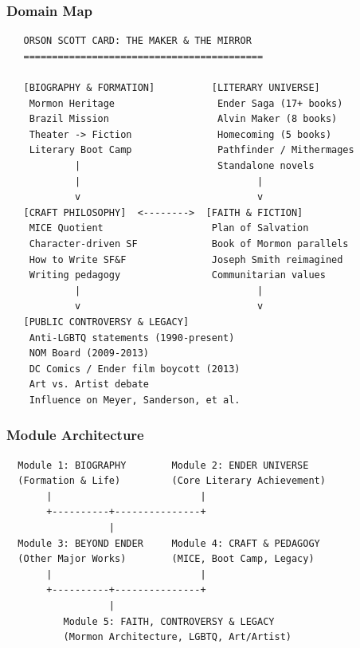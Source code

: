 \documentclass[11pt,letterpaper]{article}
\begin{document}
\subsubsection{Domain Map}

\begin{asciibox}
\begin{verbatim}
   ORSON SCOTT CARD: THE MAKER & THE MIRROR
   ==========================================

   [BIOGRAPHY & FORMATION]          [LITERARY UNIVERSE]
    Mormon Heritage                  Ender Saga (17+ books)
    Brazil Mission                   Alvin Maker (8 books)
    Theater -> Fiction               Homecoming (5 books)
    Literary Boot Camp               Pathfinder / Mithermages
            |                        Standalone novels
            |                               |
            v                               v
   [CRAFT PHILOSOPHY]  <-------->  [FAITH & FICTION]
    MICE Quotient                   Plan of Salvation
    Character-driven SF             Book of Mormon parallels
    How to Write SF&F               Joseph Smith reimagined
    Writing pedagogy                Communitarian values
            |                               |
            v                               v
   [PUBLIC CONTROVERSY & LEGACY]
    Anti-LGBTQ statements (1990-present)
    NOM Board (2009-2013)
    DC Comics / Ender film boycott (2013)
    Art vs. Artist debate
    Influence on Meyer, Sanderson, et al.
\end{verbatim}
\end{asciibox}

\subsubsection{Module Architecture}

\begin{asciibox}
\begin{verbatim}
  Module 1: BIOGRAPHY        Module 2: ENDER UNIVERSE
  (Formation & Life)         (Core Literary Achievement)
       |                          |
       +----------+---------------+
                  |
  Module 3: BEYOND ENDER     Module 4: CRAFT & PEDAGOGY
  (Other Major Works)        (MICE, Boot Camp, Legacy)
       |                          |
       +----------+---------------+
                  |
          Module 5: FAITH, CONTROVERSY & LEGACY
          (Mormon Architecture, LGBTQ, Art/Artist)
\end{verbatim}
\end{asciibox}
\end{document}
